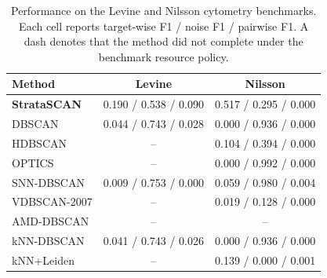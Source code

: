 \begin{table}[t]
\centering
\caption{Performance on the Levine and Nilsson cytometry benchmarks. Each cell reports target-wise F1 / noise F1 / pairwise F1. A dash denotes that the method did not complete under the benchmark resource policy.}
\label{tab:biology-levine-nilsson}
\setlength{\tabcolsep}{5pt}
\begin{tabular}{lcc}
\toprule
Method & Levine & Nilsson \\
\midrule
\textbf{StrataSCAN} & 0.190 / 0.538 / 0.090 & 0.517 / 0.295 / 0.000 \\
DBSCAN & 0.044 / 0.743 / 0.028 & 0.000 / 0.936 / 0.000 \\
HDBSCAN & -- & 0.104 / 0.394 / 0.000 \\
OPTICS & -- & 0.000 / 0.992 / 0.000 \\
SNN-DBSCAN & 0.009 / 0.753 / 0.000 & 0.059 / 0.980 / 0.004 \\
VDBSCAN-2007 & -- & 0.019 / 0.128 / 0.000 \\
AMD-DBSCAN & -- & -- \\
kNN-DBSCAN & 0.041 / 0.743 / 0.026 & 0.000 / 0.936 / 0.000 \\
kNN+Leiden & -- & 0.139 / 0.000 / 0.001 \\
\bottomrule
\end{tabular}
\end{table}
